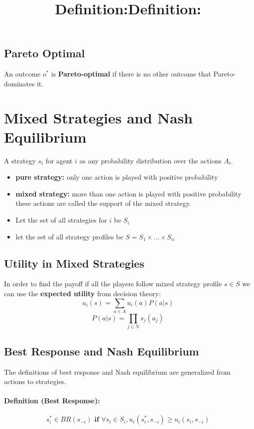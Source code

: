 \subsection{Pareto Optimal}
\title{\textbf{Definition:}}
An outcome $o^*$ is \textbf{Pareto-optimal} if there is no other outcome that Pareto-dominates it.
\section{Mixed Strategies and Nash Equilibrium}
\title{\textbf{Definition:}}
A strategy $s_i$ for agent $i$ as any probability distribution over the actions $A_i$.
\begin{itemize}
\item \textbf{pure strategy:} only one action is played with positive probability
\item \textbf{mixed strategy:} more than one action is played with positive probability
\bigbreak
these actions are called the support of the mixed strategy.
\item Let the set of all strategies for $i$ be $S_i$
\item let the set of all strategy profiles be $S = S_1 \times... \times S_n$
\end{itemize}
\subsection{Utility in Mixed Strategies}
In order to find the payoff if all the players follow mixed strategy profile $s \in S$ we can use the \textbf{expected utility} from decision theory: 
\begin{equation} u_i(s) = \sum_{a \in A}u_i(a)P(a|s)\end{equation}
\begin{equation} P(a|s) = \prod_{j \in N}s_j(a_j)\end{equation}
\subsection{Best Response and Nash Equilibrium}The definitions of best response and Nash equilibrium are generalized from actions to strategies. 

\paragraph{Definition (Best Response): }
\begin{equation}
s_i^* \in BR(s_{-i}) \textbf{ if }   \forall s_i \in S_i, u_i(s_i^*,s_{-i}) \geq u_i(s_i, s_{-i})
\end{equation}



